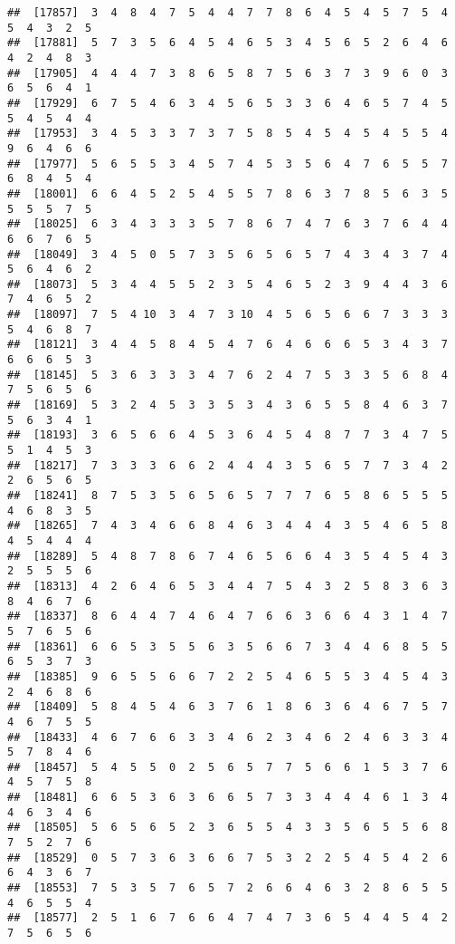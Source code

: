 \documentclass[
]{book}
\begin{document}
\begin{verbatim}
##  [17857]  3  4  8  4  7  5  4  4  7  7  8  6  4  5  4  5  7  5  4  5  4  3  2  5
##  [17881]  5  7  3  5  6  4  5  4  6  5  3  4  5  6  5  2  6  4  6  4  2  4  8  3
##  [17905]  4  4  4  7  3  8  6  5  8  7  5  6  3  7  3  9  6  0  3  6  5  6  4  1
##  [17929]  6  7  5  4  6  3  4  5  6  5  3  3  6  4  6  5  7  4  5  5  4  5  4  4
##  [17953]  3  4  5  3  3  7  3  7  5  8  5  4  5  4  5  4  5  5  4  9  6  4  6  6
##  [17977]  5  6  5  5  3  4  5  7  4  5  3  5  6  4  7  6  5  5  7  6  8  4  5  4
##  [18001]  6  6  4  5  2  5  4  5  5  7  8  6  3  7  8  5  6  3  5  5  5  5  7  5
##  [18025]  6  3  4  3  3  3  5  7  8  6  7  4  7  6  3  7  6  4  4  6  6  7  6  5
##  [18049]  3  4  5  0  5  7  3  5  6  5  6  5  7  4  3  4  3  7  4  5  6  4  6  2
##  [18073]  5  3  4  4  5  5  2  3  5  4  6  5  2  3  9  4  4  3  6  7  4  6  5  2
##  [18097]  7  5  4 10  3  4  7  3 10  4  5  6  5  6  6  7  3  3  3  5  4  6  8  7
##  [18121]  3  4  4  5  8  4  5  4  7  6  4  6  6  6  5  3  4  3  7  6  6  6  5  3
##  [18145]  5  3  6  3  3  3  4  7  6  2  4  7  5  3  3  5  6  8  4  7  5  6  5  6
##  [18169]  5  3  2  4  5  3  3  5  3  4  3  6  5  5  8  4  6  3  7  5  6  3  4  1
##  [18193]  3  6  5  6  6  4  5  3  6  4  5  4  8  7  7  3  4  7  5  5  1  4  5  3
##  [18217]  7  3  3  3  6  6  2  4  4  4  3  5  6  5  7  7  3  4  2  2  6  5  6  5
##  [18241]  8  7  5  3  5  6  5  6  5  7  7  7  6  5  8  6  5  5  5  4  6  8  3  5
##  [18265]  7  4  3  4  6  6  8  4  6  3  4  4  4  3  5  4  6  5  8  4  5  4  4  4
##  [18289]  5  4  8  7  8  6  7  4  6  5  6  6  4  3  5  4  5  4  3  2  5  5  5  6
##  [18313]  4  2  6  4  6  5  3  4  4  7  5  4  3  2  5  8  3  6  3  8  4  6  7  6
##  [18337]  8  6  4  4  7  4  6  4  7  6  6  3  6  6  4  3  1  4  7  5  7  6  5  6
##  [18361]  6  6  5  3  5  5  6  3  5  6  6  7  3  4  4  6  8  5  5  6  5  3  7  3
##  [18385]  9  6  5  5  6  6  7  2  2  5  4  6  5  5  3  4  5  4  3  2  4  6  8  6
##  [18409]  5  8  4  5  4  6  3  7  6  1  8  6  3  6  4  6  7  5  7  4  6  7  5  5
##  [18433]  4  6  7  6  6  3  3  4  6  2  3  4  6  2  4  6  3  3  4  5  7  8  4  6
##  [18457]  5  4  5  5  0  2  5  6  5  7  7  5  6  6  1  5  3  7  6  4  5  7  5  8
##  [18481]  6  6  5  3  6  3  6  6  5  7  3  3  4  4  4  6  1  3  4  4  6  3  4  6
##  [18505]  5  6  5  6  5  2  3  6  5  5  4  3  3  5  6  5  5  6  8  7  5  2  7  6
##  [18529]  0  5  7  3  6  3  6  6  7  5  3  2  2  5  4  5  4  2  6  6  4  3  6  7
##  [18553]  7  5  3  5  7  6  5  7  2  6  6  4  6  3  2  8  6  5  5  4  6  5  5  4
##  [18577]  2  5  1  6  7  6  6  4  7  4  7  3  6  5  4  4  5  4  2  7  5  6  5  6

\end{verbatim}
\end{document}
